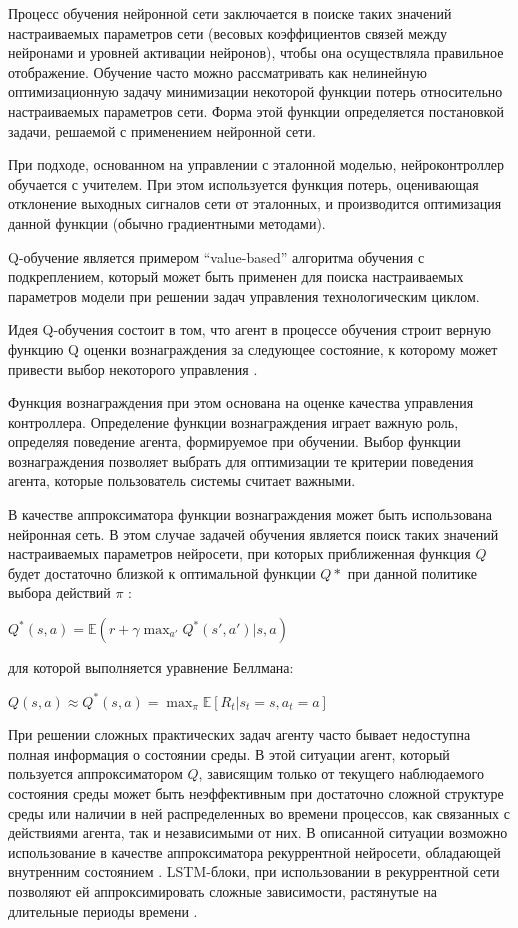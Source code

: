 Процесс обучения нейронной сети заключается в поиске таких значений настраиваемых параметров сети (весовых коэффициентов связей между нейронами и уровней активации нейронов), чтобы она осуществляла правильное отображение. Обучение часто можно рассматривать как нелинейную оптимизационную задачу минимизации некоторой функции потерь относительно настраиваемых параметров сети. Форма этой функции определяется постановкой задачи, решаемой с применением нейронной сети.

При подходе, основанном на управлении с эталонной моделью, нейроконтроллер обучается с учителем. При этом используется функция потерь, оценивающая отклонение выходных сигналов сети от эталонных, и производится оптимизация данной функции (обычно градиентными методами).


Q-обучение  является примером ``value-based'' алгоритма обучения с подкреплением, который может быть применен для поиска настраиваемых параметров модели при решении задач управления технологическим циклом.


Идея Q-обучения состоит в том, что агент в процессе обучения строит верную функцию Q оценки вознаграждения за следующее состояние, к которому может привести выбор некоторого управления .


Функция вознаграждения при этом основана на оценке качества управления контроллера. Определение функции вознаграждения играет важную роль, определяя поведение агента, формируемое при обучении. Выбор функции вознаграждения позволяет выбрать для оптимизации те критерии поведения агента, которые пользователь системы считает важными.


В качестве аппроксиматора функции вознаграждения может быть использована нейронная сеть. В этом случае задачей обучения является поиск таких значений настраиваемых параметров нейросети, при которых приближенная функция $Q$ будет достаточно близкой к оптимальной функции $Q*$ при данной политике выбора действий $\pi$ :


$Q^{*}(s,a)=\mathbb{E}(r+\gamma \max_{a'}Q^{*}(s',a')|s,a) $


для которой выполняется уравнение Беллмана:

$Q(s,a)\approx Q^{*}(s,a)=\max_{\pi}\mathbb{E}\left [ R_t|s_t=s,a_t=a \right ]$

При решении сложных практических задач агенту часто бывает недоступна полная информация о состоянии среды. В этой ситуации агент, который пользуется аппроксиматором $Q$, зависящим только от текущего наблюдаемого состояния среды может быть неэффективным при достаточно сложной структуре среды или наличии в ней распределенных во времени процессов, как связанных с действиями агента, так и независимыми от них. В описанной ситуации возможно использование в качестве аппроксиматора рекуррентной нейросети, обладающей внутренним состоянием . LSTM-блоки, при использовании в рекуррентной сети позволяют ей аппроксимировать сложные зависимости, растянутые на длительные периоды времени .



